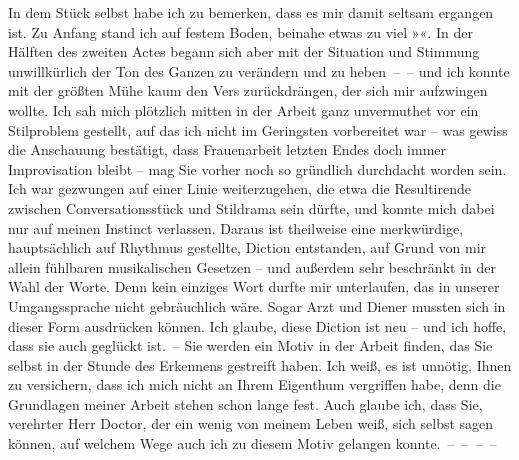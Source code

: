 \pstart
           In dem Stück selbst habe ich
               zu bemerken, dass es mir damit seltsam ergangen ist. Zu Anfang stand ich auf festem
               Boden, beinahe etwas zu viel »\label{K_L03730-3v}\label{K_L03730-3}«. In der Hälften des zweiten Actes begann sich
               aber mit der Situation und Stimmung unwillkürlich der Ton des Ganzen zu verändern und
               zu heben – – und ich konnte mit der größten Mühe kaum den Vers zurückdrängen, der
               sich mir aufzwingen wollte. Ich sah mich plötzlich mitten in der Arbeit ganz
               unvermuthet vor ein Stilproblem gestellt, auf das ich nicht im Geringsten vorbereitet
               war – was gewiss die Anschauung bestätigt, dass {\pb}Frauenarbeit letzten
               Endes doch immer Improvisation bleibt – mag Sie vorher noch so gründlich durchdacht
               worden sein. Ich war gezwungen auf einer Linie weiterzugehen, die etwa die
               Resultirende zwischen Conversationsstück und Stildrama sein dürfte, und konnte mich
               dabei nur auf meinen Instinct verlassen. Daraus ist theilweise eine merkwürdige,
               hauptsächlich auf Rhythmus gestellte, Diction entstanden, auf Grund von mir allein
               fühlbaren \introOben{}musikalischen\introOben{} Gesetzen – und außerdem sehr beschränkt in der
               Wahl der Worte. Denn kein einziges Wort durfte mir unterlaufen, das in unserer
               Umgangssprache nicht gebräuchlich wäre. Sogar Arzt und Diener mussten sich in dieser
               Form ausdrücken können. Ich glaube, diese Diction ist neu – und ich hoffe, dass sie
               auch geglückt ist. – Sie werden ein Motiv in der Arbeit finden, das Sie selbst in der Stunde des Erkennens
               gestreift haben. Ich weiß, es ist unnötig, Ihnen zu versichern, dass ich mich nicht
               an Ihrem Eigenthum vergriffen habe, denn die Grundlagen meiner Arbeit stehen schon lange fest. Auch glaube ich, dass Sie,
               verehrter Herr Doctor, der ein wenig von meinem Leben weiß, sich selbst sagen können,
               auf welchem Wege auch ich zu diesem Motiv gelangen konnte. – – – –\pend
           
